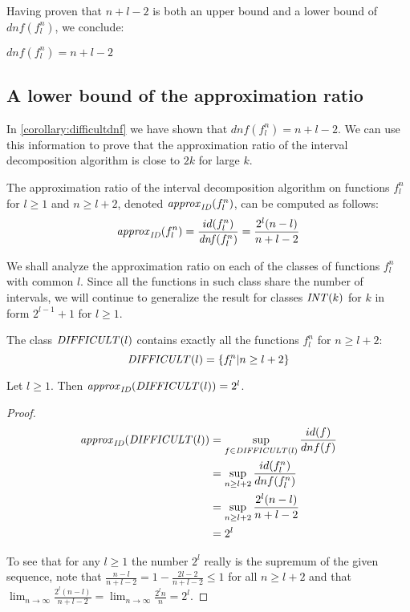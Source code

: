 Having proven that $n+l-2$ is both an upper bound
and a lower bound of $dnf(f_l^n)$,
we conclude:
\begin{corollary}
\label{corollary:difficultdnf}
$dnf(f_l^n) = n+l-2$
\end{corollary}

\subsection{A lower bound of the approximation ratio}

In \cref{corollary:difficultdnf}
we have shown that $dnf(f_l^n) = n+l-2$.
We can use this information to prove
that the approximation ratio
of the interval decomposition algorithm is close to $2k$
for large $k$.

The approximation ratio
of the interval decomposition algorithm
on functions $f_l^n$
for $l \geq 1$ and $n \geq l+2$,
denoted $\mathit{approx}_{\mathit{ID}} (f_l^n)$,
can be computed as follows:
$$
\mathit{approx}_{\mathit{ID}} (f_l^n)
= \frac{id(f_l^n)}{\mathit{dnf}(f_l^n)}
= \frac{2^l(n-l)}{n+l-2}
$$

\newcommand{\difficultl}[1]{\apply{\mathit{DIFFICULT}}{#1}}

We shall analyze the approximation ratio
on each of the classes of functions $f_l^n$
with common $l$.
Since all the functions in such class
share the number of intervals,
we will continue to generalize the result
for classes $\mathit{INT} (k)$
for $k$ in form $2^{l-1} + 1$ for $l \geq 1$.

\begin{definition}
The class $\difficultl{l}$ contains exactly
all the functions $f_l^n$ for $n \geq l+2$:
$$
\difficultl{l}
= \curly{f_l^n | n \geq l + 2}
$$
\end{definition}

\begin{observation}
\label{observation:difficultapproxidl}
Let $l \geq 1$.
Then $\approxid{\difficultl{l}} = 2^l$.
\end{observation}

\begin{proof}
\begin{align*}
\approxid{\difficultl{l}}
&= \sup_{f \in \difficultl{l}}{\frac{id(f)}{dnf(f)}} \\
&= \sup_{n \geq l+2}{\frac{id(f_l^n)}{dnf(f_l^n)}} \\
&= \sup_{n \geq l+2}{\frac{2^l(n-l)}{n+l-2}} \\
&= 2^l
\end{align*}

To see that for any $l \geq 1$
the number $2^l$ really is the supremum of the given sequence,
note that $\frac{n-l}{n+l-2}
= 1 - \frac{2l-2}{n+l-2} \leq 1$
for all $n \geq l+2$
and that
$\lim_{n \rightarrow \infty}{\frac{2^l(n-l)}{n+l-2}}
= \lim_{n \rightarrow \infty}{\frac{2^l n}{n}}
= 2^l$.
\end{proof}


